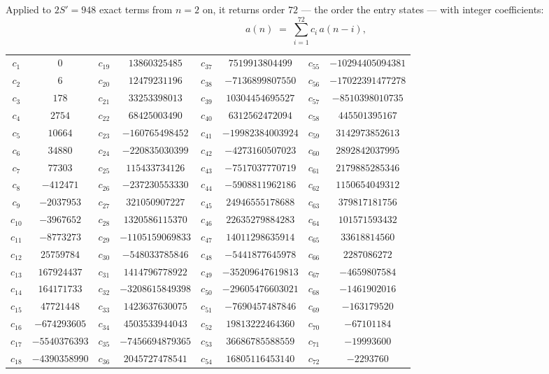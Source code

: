 \documentclass[11pt,a4paper]{article}
\theoremstyle{plain}
\theoremstyle{definition}
\begin{document}
Applied to $2S'=948$ exact terms from $n=2$ on, it returns order $72$ --- the
order the entry states --- with integer coefficients:
\[
a(n)\;=\;\sum_{i=1}^{72}c_i\,a(n-i),
\]
\begin{center}\small
\begin{tabular}{cccccccc}
$c_{1}$ & $0$ & $c_{19}$ & $13860325485$ & $c_{37}$ & $7519913804499$ & $c_{55}$ & $-10294405094381$ \\
$c_{2}$ & $6$ & $c_{20}$ & $12479231196$ & $c_{38}$ & $-7136899807550$ & $c_{56}$ & $-17022391477278$ \\
$c_{3}$ & $178$ & $c_{21}$ & $33253398013$ & $c_{39}$ & $10304454695527$ & $c_{57}$ & $-8510398010735$ \\
$c_{4}$ & $2754$ & $c_{22}$ & $68425003490$ & $c_{40}$ & $6312562472094$ & $c_{58}$ & $445501395167$ \\
$c_{5}$ & $10664$ & $c_{23}$ & $-160765498452$ & $c_{41}$ & $-19982384003924$ & $c_{59}$ & $3142973852613$ \\
$c_{6}$ & $34880$ & $c_{24}$ & $-220835030399$ & $c_{42}$ & $-4273160507023$ & $c_{60}$ & $2892842037995$ \\
$c_{7}$ & $77303$ & $c_{25}$ & $115433734126$ & $c_{43}$ & $-7517037770719$ & $c_{61}$ & $2179885285346$ \\
$c_{8}$ & $-412471$ & $c_{26}$ & $-237230553330$ & $c_{44}$ & $-5908811962186$ & $c_{62}$ & $1150654049312$ \\
$c_{9}$ & $-2037953$ & $c_{27}$ & $321050907227$ & $c_{45}$ & $24946555178688$ & $c_{63}$ & $379817181756$ \\
$c_{10}$ & $-3967652$ & $c_{28}$ & $1320586115370$ & $c_{46}$ & $22635279884283$ & $c_{64}$ & $101571593432$ \\
$c_{11}$ & $-8773273$ & $c_{29}$ & $-1105159069833$ & $c_{47}$ & $14011298635914$ & $c_{65}$ & $33618814560$ \\
$c_{12}$ & $25759784$ & $c_{30}$ & $-548033785846$ & $c_{48}$ & $-5441877645978$ & $c_{66}$ & $2287086272$ \\
$c_{13}$ & $167924437$ & $c_{31}$ & $1414796778922$ & $c_{49}$ & $-35209647619813$ & $c_{67}$ & $-4659807584$ \\
$c_{14}$ & $164171733$ & $c_{32}$ & $-3208615849398$ & $c_{50}$ & $-29605476603021$ & $c_{68}$ & $-1461902016$ \\
$c_{15}$ & $47721448$ & $c_{33}$ & $1423637630075$ & $c_{51}$ & $-7690457487846$ & $c_{69}$ & $-163179520$ \\
$c_{16}$ & $-674293605$ & $c_{34}$ & $4503533944043$ & $c_{52}$ & $19813222464360$ & $c_{70}$ & $-67101184$ \\
$c_{17}$ & $-5540376393$ & $c_{35}$ & $-7456694879365$ & $c_{53}$ & $36686785588559$ & $c_{71}$ & $-19993600$ \\
$c_{18}$ & $-4390358990$ & $c_{36}$ & $2045727478541$ & $c_{54}$ & $16805116453140$ & $c_{72}$ & $-2293760$ \\
\end{tabular}
\end{center}
\end{document}

